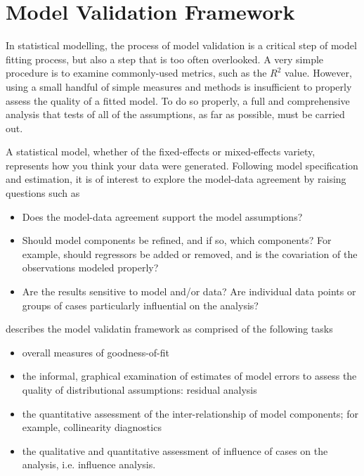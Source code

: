 \documentclass[12pt, a4paper]{article}
\begin{document}
\newpage

			\section{Model Validation Framework}
			In statistical modelling, the process of model validation is a critical step of model fitting process, but also a step that is too often overlooked. A very simple procedure is to examine commonly-used
			metrics, such as the $R^2$ value. However, using a small handful of simple measures and methods is insufficient to properly assess the quality of a fitted model. To do so properly, a full and comprehensive
			analysis that tests of all of the assumptions, as far as possible, must be carried out.
			
			
			A statistical model, whether of the fixed-effects or mixed-effects variety, represents how you think your data
			were generated. Following model specification and estimation, it is of interest to explore the model-data
			agreement by raising questions such as
			\begin{itemize}
				\item Does the model-data agreement support the model assumptions?
				\item Should model components be refined, and if so, which components? For example, should regressors
				be added or removed, and is the covariation of the observations modeled properly?
				\item Are the results sensitive to model and/or data? Are individual data points or groups of cases particularly
				influential on the analysis?
			\end{itemize}
			
			
			\citet{schab} describes the model validatin framework as comprised of the following tasks
			
			\begin{itemize}
				\item  overall measures of goodness-of-fit
				\item the informal, graphical examination of estimates of model errors to assess the quality of distributional
				assumptions: residual analysis
				
				
				\item the quantitative assessment of the inter-relationship of model components; for example, collinearity 	diagnostics
				\item the qualitative and quantitative assessment of influence of cases on the analysis, i.e. influence analysis.
			\end{itemize}
			
\end{document}
